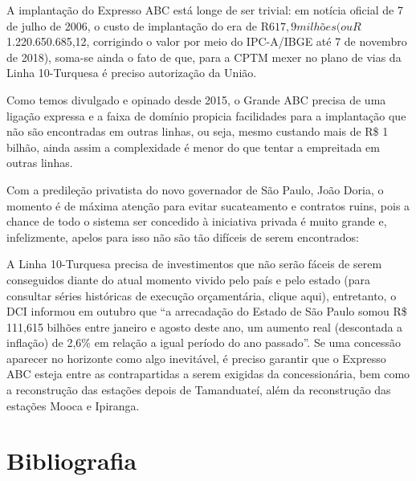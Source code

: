 \documentclass[11pt,fleqn]{book} %
\begin{document}

A implantação do Expresso ABC está longe de ser trivial: em notícia oficial de 7 de julho de 2006, o custo de implantação do era de R$ 617,9 milhões (ou R$ 1.220.650.685,12, corrigindo o valor por meio do IPC-A/IBGE até 7 de novembro de 2018), soma-se ainda o fato de que, para a CPTM mexer no plano de vias da Linha 10-Turquesa é preciso autorização da União.

Como temos divulgado e opinado desde 2015, o Grande ABC precisa de uma ligação expressa e a faixa de domínio propicia facilidades para a implantação que não são encontradas em outras linhas, ou seja, mesmo custando mais de R\$ 1 bilhão, ainda assim a complexidade é menor do que tentar a empreitada em outras linhas.

Com a predileção privatista do novo governador de São Paulo, João Doria, o momento é de máxima atenção para evitar sucateamento e contratos ruins, pois a chance de todo o sistema ser concedido à iniciativa privada é muito grande e, infelizmente, apelos para isso não são tão difíceis de serem encontrados:

A Linha 10-Turquesa precisa de investimentos que não serão fáceis de serem conseguidos diante do atual momento vivido pelo país e pelo estado (para consultar séries históricas de execução orçamentária, clique aqui), entretanto, o DCI informou em outubro que “a arrecadação do Estado de São Paulo somou R\$ 111,615 bilhões entre janeiro e agosto deste ano, um aumento real (descontada a inflação) de 2,6\% em relação a igual período do ano passado”. Se uma concessão aparecer no horizonte como algo inevitável, é preciso garantir que o Expresso ABC esteja entre as contrapartidas a serem exigidas da concessionária, bem como a reconstrução das estações depois de Tamanduateí, além da reconstrução das estações Mooca e Ipiranga.


\chapter*{Bibliografia}
\end{document}
